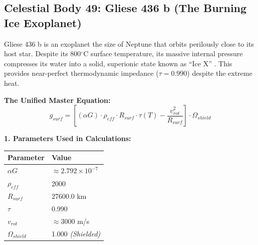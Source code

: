 \documentclass[11pt, a4paper]{article}
\begin{document}
\clearpage
\subsection{Celestial Body 49: Gliese 436 b (The Burning Ice Exoplanet)}
  Gliese 436 b is an exoplanet the size of Neptune that orbits perilously close to its host star. Despite its 800$^\circ$C surface temperature, its massive internal pressure compresses its water into a solid, superionic state known as ``Ice X'' \cite{gillon2007}. This provides near-perfect thermodynamic impedance ($\tau = 0.990$) despite the extreme heat.

  \vspace{0.5em}
  \noindent \textbf{The Unified Master Equation:}
  $$ g_{surf} = \left[ (\alpha G) \cdot \rho_{eff} \cdot R_{surf} \cdot \tau(T) - \frac{v_{rot}^2}{R_{surf}} \right] \cdot \Omega_{shield} $$

  \vspace{0.5em}
  \noindent \textbf{1. Parameters Used in Calculations:} \\[0.5em]
  \begingroup
  \renewcommand{\arraystretch}{1.3}
  \hspace*{2em}
  \begin{tabular}{|l|l|}
    \hline
    \textbf{Parameter} & \textbf{Value} \\ \hline
    $\alpha G$ & $\approx 2.792 \times 10^{-7}$ \\ \hline
    $\rho_{eff}$ & 2000 \\ \hline
    $R_{surf}$ & 27600.0 km \\ \hline
    $\tau$ & 0.990 \\ \hline
    $v_{rot}$ & $\approx 3000$ m/s \\ \hline
    $\Omega_{shield}$ & 1.000 \textit{(Shielded)} \\ \hline
  \end{tabular}
  \endgroup
\end{document}
